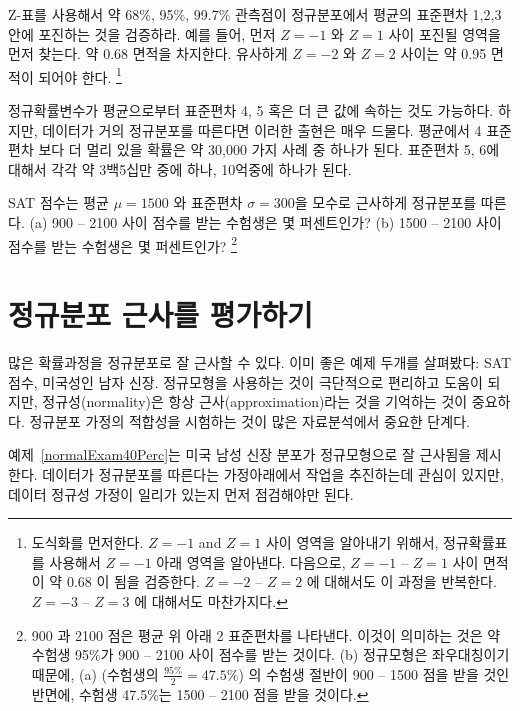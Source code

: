 \begin{exercise}
Z-표를 사용해서 약 68\%, 95\%, 99.7\% 관측점이 정규분포에서 평균의 표준편차 1,2,3 안에 포진하는 것을 검증하라. 예를 들어, 먼저 $Z=-1$ 와 $Z=1$ 사이 포진될 영역을 먼저 찾는다. 약 0.68 면적을 차지한다. 유사하게 $Z=-2$ 와 $Z=2$ 사이는 약 0.95 면적이 되어야 한다.
\footnote{
도식화를 먼저한다. $Z=-1$ and $Z=1$ 사이 영역을 알아내기 위해서, 정규확률표를 사용해서 $Z=-1$ 아래 영역을 알아낸다. 다음으로, $Z=-1$ -- $Z=1$ 사이 면적이 약 0.68 이 됨을 검증한다. $Z=-2$ -- $Z=2$ 에 대해서도 이 과정을 반복한다. $Z=-3$ -- $Z=3$ 에 대해서도 마찬가지다.}
\end{exercise}

정규확률변수가 평균으로부터 표준편차 4, 5 혹은 더 큰 값에 속하는 것도 가능하다. 하지만, 데이터가 거의 정규분포를 따른다면 이러한 출현은 매우 드물다. 평균에서 4 표준편차 보다 더 멀리 있을 확률은 약 30,000 가지 사례 중 하나가 된다. 표준편차 5, 6에 대해서 각각 약 3백5십만 중에 하나, 10억중에 하나가 된다.

\begin{exercise}
SAT 점수는 평균 $\mu = 1500$ 와 표준편차  $\sigma = 300$을 모수로 근사하게 정규분포를 따른다. (a) 900 -- 2100 사이 점수를 받는 수험생은 몇 퍼센트인가? (b) 1500 -- 2100 사이 점수를 받는 수험생은 몇 퍼센트인가?
\footnote{900 과 2100 점은 평균 위 아래 2 표준편차를 나타낸다. 이것이 의미하는 것은 약 수험생 95\%가 900 -- 2100 사이 점수를 받는 것이다. (b) 정규모형은 좌우대칭이기 때문에, (a) (수험생의 $\frac{95\%}{2} = 47.5\%$) 의 수험생 절반이 900 -- 1500 점을 받을 것인 반면에, 
수험생 47.5\%는 1500 -- 2100 점을 받을 것이다.}
\end{exercise}

\section{정규분포 근사를 평가하기}
\label{assessingNormal}

많은 확률과정을 정규분포로 잘 근사할 수 있다. 이미 좋은 예제 두개를 살펴봤다: SAT 점수, 미국성인 남자 신장. 정규모형을 사용하는 것이 극단적으로 편리하고 도움이 되지만, 정규성(normality)은 항상 근사(approximation)라는 것을 기억하는 것이 중요하다. 정규분포 가정의 적합성을 시험하는 것이 많은 자료분석에서 중요한 단계다.


예제~\ref{normalExam40Perc}는 미국 남성 신장 분포가 정규모형으로 잘 근사됨을 제시한다. 데이터가 정규분포를 따른다는 가정아래에서 작업을 추진하는데 관심이 있지만, 데이터 정규성 가정이 일리가 있는지 먼저 점검해야만 된다.


